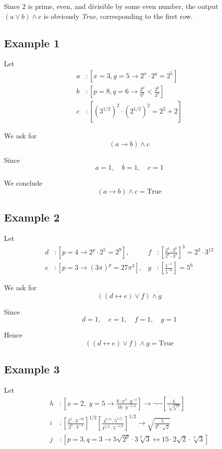\documentclass[12pt,a4paper,openany]{article}
\begin{document}
Since \(2\) is prime, even, and divisible by some even number, the output
\((a \lor b) \land c\) is obviously \emph{True}, corresponding to the first row.

\subsection{Example 1}\label{example-1}

Let
\[
\begin{aligned}
a &: \left[x = 3, y = 5 \to 2^x \cdot 2^y = 2^5\right] \\
b &: \left[p = 8, q = 6 \to \frac{2^p}{q^q} < \frac{2^p}{3^9}\right] \\
c &: \left[\left(3^{1/2}\right)^2 \cdot \left(2^{1/2}\right)^2 = 2^2 + 2 \right]
\end{aligned}
\]

We ask for
\[
(a \to b) \land c
\]

Since
\[
a = 1, \quad b = 1, \quad c = 1
\]

We conclude
\[
\boxed{(a \to b) \land c = \text{True}}
\]

\subsection{Example 2}\label{example-2}

Let
\[
\begin{aligned}
d &: \left[p=4 \to 2^p \cdot 2^5 = 2^9\right], & 
f &: \left[\frac{2^4 \cdot 3^6}{2^3 \cdot 3^2}\right]^3 = 2^3 \cdot 3^{12} \\
e &: \left[p=3 \to (3\pi)^p = 27\pi^3\right], &
g &: \left[\frac{1^{-1}}{5^{-6}}\right] = 5^6
\end{aligned}
\]

We ask for
\[
((d \leftrightarrow e) \lor f) \land g
\]

Since
\[
d = 1, \quad e = 1, \quad f = 1, \quad g = 1
\]

Hence
\[
\boxed{((d \leftrightarrow e) \lor f) \land g = \text{True}}
\]

\subsection{Example 3}\label{example-3}

Let
\[
\begin{aligned}
h &: \left[ x=2, \; y=5 \to \frac{8 \cdot x^3 \cdot y^{-4}}{16 \cdot y^{-1/4}}\right] \to \neg \neg \left[\frac{4}{\sqrt[4]{5^{15}}}\right] \\
i &: \left[\frac{2^5 \cdot 3^{-10}}{2^5 \cdot 3^{-4}}\right]^{1/2} \left[\frac{4^{1/4} \cdot 5^{1/2}}{4^{1/2} \cdot 5^{-1/2}}\right]^{1/2} \to \sqrt{\frac{5}{3^6 \cdot \sqrt{2}}} \\
j &: \left[p=3, q=3 \to 5 \sqrt{2^p} \cdot 3 \sqrt[q]{3} \leftrightarrow 15 \cdot 2 \sqrt{2} \cdot \sqrt[3]{3}\right]
\end{aligned}
\]
\end{document}

